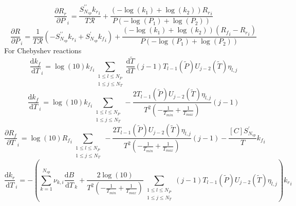 \documentclass[a4paper,10pt]{article}
\newcommand{\ns}{N_{sp}}
\newcommand{\Ru}{\mathcal{R}}
\begin{document}
\begin{dmath} \frac{\partial {R_r} }{\partial P }_{i} = \frac{S^{\prime\prime}_{\ns} {k_r}_{i}}{T \Ru} + \frac{\left(- \log{\left (k_{1} \right )} + \log{\left (k_{2} \right )}\right) {R_r}_{i}}{P \left(- \log{\left (P_{1} \right )} + \log{\left (P_{2} \right )}\right)}\end{dmath} 
\begin{dmath} \frac{\partial R }{\partial P }_{i} = \frac{1}{T \Ru} \left(- S^{\prime\prime}_{\ns} {k_r}_{i} + S^{\prime}_{\ns} {k_f}_{i}\right) + \frac{\left(- \log{\left (k_{1} \right )} + \log{\left (k_{2} \right )}\right) \left({R_f}_{i} - {R_r}_{i}\right)}{P \left(- \log{\left (P_{1} \right )} + \log{\left (P_{2} \right )}\right)}\end{dmath} 
For Chebyshev reactions
\begin{dmath} \frac{\text{d} {k_f} }{\text{d} T }_{i} = \log{\left (10 \right )} {k_f}_{i} \sum_{\substack{1 \leq l \leq N_{P}\\1 \leq j \leq N_{T}}} \frac{\text{d} \tilde{T} }{\text{d} T } \left(j - 1\right) T_{l - 1}\left(\tilde{P}\right) U_{j - 2}\left(\tilde{T}\right) \eta_{l,j}\end{dmath} 
\begin{dmath} \frac{\text{d} {k_f} }{\text{d} T }_{i} = \log{\left (10 \right )} {k_f}_{i} \sum_{\substack{1 \leq l \leq N_{P}\\1 \leq j \leq N_{T}}} - \frac{2 T_{l - 1}\left(\tilde{P}\right) U_{j - 2}\left(\tilde{T}\right) \eta_{l,j}}{T^{2} \left(- \frac{1}{T_{min}} + \frac{1}{T_{max}}\right)} \left(j - 1\right)\end{dmath} 
\begin{dmath} \frac{\partial {R_f} }{\partial T }_{i} = \log{\left (10 \right )} {R_f}_{i} \sum_{\substack{1 \leq l \leq N_{P}\\1 \leq j \leq N_{T}}} - \frac{2 T_{l - 1}\left(\tilde{P}\right) U_{j - 2}\left(\tilde{T}\right) \eta_{l,j}}{T^{2} \left(- \frac{1}{T_{min}} + \frac{1}{T_{max}}\right)} \left(j - 1\right) - \frac{[C] S^{\prime}_{\ns}}{T} {k_f}_{i}\end{dmath} 
\begin{dmath} \frac{\text{d} {k_r} }{\text{d} T }_{i} = - \left(\sum_{k=1}^{\ns} \nu_{k,i} \frac{\text{d} B }{\text{d} T }_{k} + \frac{2 \log{\left (10 \right )}}{T^{2} \left(- \frac{1}{T_{min}} + \frac{1}{T_{max}}\right)} \sum_{\substack{1 \leq l \leq N_{P}\\1 \leq j \leq N_{T}}} \left(j - 1\right) T_{l - 1}\left(\tilde{P}\right) U_{j - 2}\left(\tilde{T}\right) \eta_{l,j}\right) {k_r}_{i}\end{dmath} 
\end{document}
